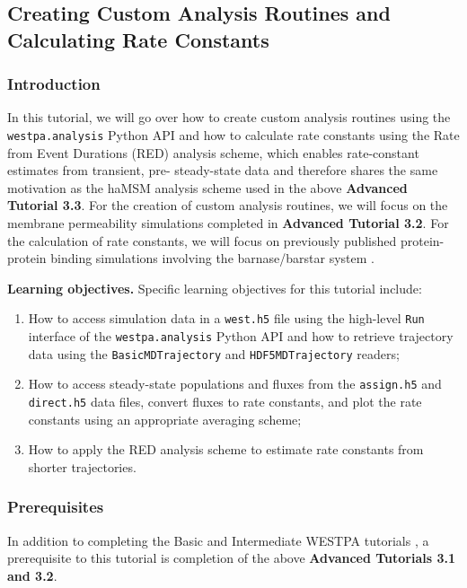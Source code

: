 \subsection{Creating Custom Analysis Routines and Calculating Rate Constants}

\subsubsection{Introduction}

In this tutorial, we will go over how to create custom analysis routines using the \verb|westpa.analysis| Python API and how to calculate rate constants using the Rate from Event Durations (RED) analysis scheme, which enables rate-constant estimates from transient, pre- steady-state data and therefore shares the same motivation as the haMSM analysis scheme \citep{copperman_accelerated_2020,russo_westpa_2022} used in the above \textbf{Advanced Tutorial 3.3}.
For the creation of custom analysis routines, we will focus on the membrane permeability simulations completed in \textbf{Advanced Tutorial 3.2}.
For the calculation of rate constants, we will focus on previously published protein-protein binding simulations involving the barnase/barstar system \citep{saglam_proteinprotein_2019}.   

\textbf{Learning objectives.} Specific learning objectives for this tutorial include:
\begin{enumerate}
    \item How to access simulation data in a \verb|west.h5| file using the high-level \verb|Run| interface of the \verb|westpa.analysis| Python API and how to retrieve trajectory data using the \verb|BasicMDTrajectory| and \verb|HDF5MDTrajectory| readers;
    \item How to access steady-state populations and fluxes from the \verb|assign.h5| and \verb|direct.h5| data files, convert fluxes to rate constants, and plot the rate constants using an appropriate averaging scheme;
    \item How to apply the RED analysis scheme to estimate rate constants from shorter trajectories.
\end{enumerate}

\subsubsection{Prerequisites}
In addition to completing the Basic and Intermediate WESTPA tutorials \citep{bogetti_suite_2019}, a prerequisite to this tutorial is completion of the above \textbf{Advanced Tutorials 3.1 and 3.2}.

